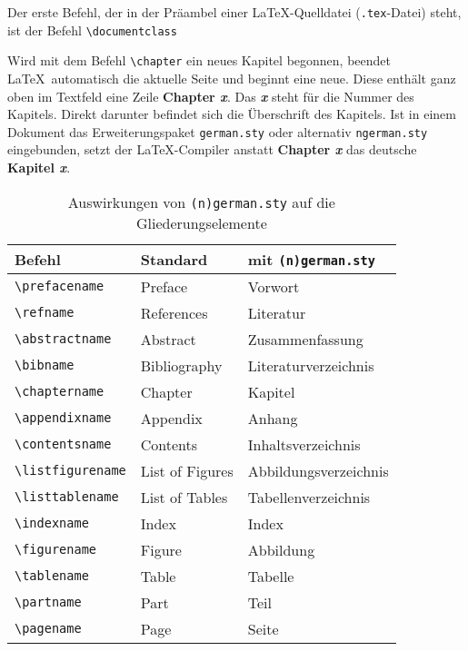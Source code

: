 Der erste Befehl, der in der Präambel einer \LaTeX-Quelldatei (\verb!.tex!-Datei) steht, ist der Befehl \verb!\documentclass!
\begin{document}
Wird mit dem Befehl \texttt{\textbackslash chapter} ein neues Kapitel begonnen,
beendet \LaTeX\ automatisch die
aktuelle Seite und beginnt eine neue. 
Diese enthält ganz oben im Textfeld eine Zeile \glqq\textbf{Chapter \textsl{x}}\grqq. 
Das \textbf{\textsl{x}} 
steht für die Nummer des Kapitels.
Direkt darunter befindet sich die
Überschrift des Kapitels. Ist in einem Dokument das Erweiterungspaket
\verb!german.sty! oder alternativ \verb!ngerman.sty! eingebunden, setzt der \LaTeX-Compiler anstatt 
\textbf{Chapter \textsl{x}} das deutsche 
\textbf{Kapitel \textsl{x}}. 


\begin{table}[htb]
\centering
\caption{Auswirkungen von \texttt{(n)german.sty} auf die Gliederungselemente}
\label{Tabelle_Deutsche_Gliederungsebenen}       %
\begin{tabular}{lll}
\hline
Befehl & Standard & mit \texttt{(n)german.sty} \\
\hline
\texttt{\textbackslash prefacename} & Preface & Vorwort \\
\texttt{\textbackslash refname} & References & Literatur \\
\texttt{\textbackslash abstractname} & Abstract & Zusammenfassung \\
\texttt{\textbackslash bibname} & Bibliography & Literaturverzeichnis \\
\texttt{\textbackslash chaptername} & Chapter & Kapitel \\
\texttt{\textbackslash appendixname} & Appendix & Anhang \\
\texttt{\textbackslash contentsname} & Contents & Inhaltsverzeichnis \\
\texttt{\textbackslash listfigurename} & List of Figures & Abbildungsverzeichnis\\
\texttt{\textbackslash listtablename} & List of Tables & Tabellenverzeichnis \\
\texttt{\textbackslash indexname} & Index & Index \\
\texttt{\textbackslash figurename} & Figure & Abbildung \\
\texttt{\textbackslash tablename} & Table & Tabelle \\
\texttt{\textbackslash partname} & Part & Teil \\
\texttt{\textbackslash pagename} & Page & Seite \\
\hline
\end{tabular}
\end{table}
\end{document}
